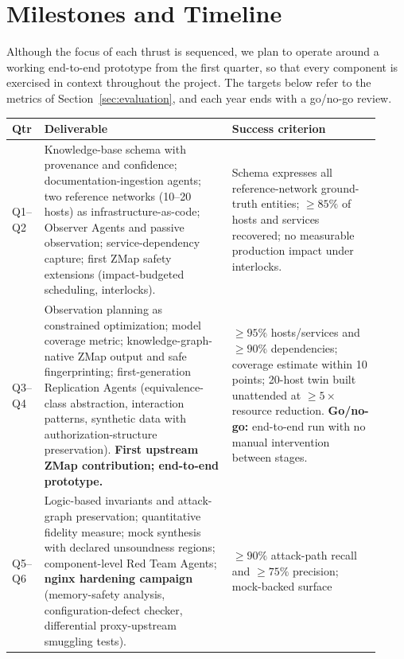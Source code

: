\section{Milestones and Timeline}
\label{sec:timeline}

Although the focus of each thrust is sequenced, we plan to operate around a
working end-to-end prototype from the first quarter, so that every component
is exercised in context throughout the project. The targets below refer to
the metrics of Section~\ref{sec:evaluation}, and each year ends with a
go/no-go review.

{\footnotesize\setlength{\tabcolsep}{4pt}\renewcommand{\arraystretch}{0.93}
\begin{longtable}{@{}p{0.06\linewidth}p{0.48\linewidth}p{0.385\linewidth}@{}}
\toprule
\textbf{Qtr} & \textbf{Deliverable} & \textbf{Success criterion}\\
\midrule
Q1--Q2 & Knowledge-base schema with provenance and confidence;
     documentation-ingestion agents; two reference networks (10--20 hosts) as
     infrastructure-as-code; Observer Agents and passive observation;
     service-dependency capture; first ZMap safety extensions
     (impact-budgeted scheduling, interlocks).
   & Schema expresses all reference-network ground-truth entities; $\geq 85\%$
     of hosts and services recovered; no measurable production impact under
     interlocks.\\
\addlinespace[2pt]
Q3--Q4 & Observation planning as constrained optimization; model coverage
     metric; knowledge-graph-native ZMap output and safe fingerprinting;
     first-generation Replication Agents (equivalence-class abstraction,
     interaction patterns, synthetic data with authorization-structure
     preservation). \textbf{First upstream ZMap contribution; end-to-end
     prototype.}
   & $\geq 95\%$ hosts/services and $\geq 90\%$ dependencies; coverage estimate
     within 10 points; 20-host twin built unattended at $\geq 5\times$ resource
     reduction. \textbf{Go/no-go:} end-to-end run with no manual intervention
     between stages.\\
\addlinespace[2pt]
Q5--Q6 & Logic-based invariants and attack-graph preservation; quantitative
     fidelity measure; mock synthesis with declared unsoundness regions;
     component-level Red Team Agents; \textbf{nginx hardening campaign}
     (memory-safety analysis, configuration-defect checker, differential
     proxy-upstream smuggling tests).
   & $\geq 90\%$ attack-path recall and $\geq 75\%$ precision; mock-backed surface

\end{longtable}}
